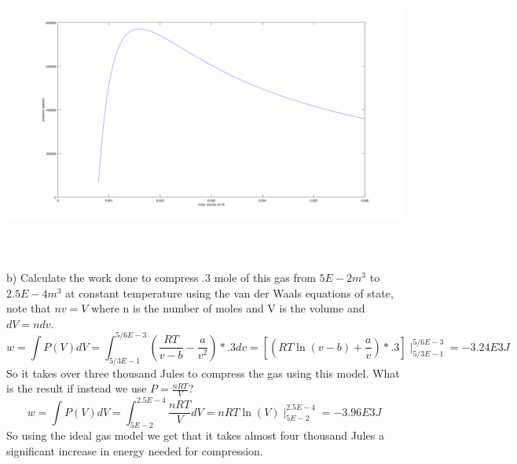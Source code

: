 \documentclass[10pt,a4paper]{article}
\begin{document}
\includegraphics[scale=.35]{two}\\\\\\\\

b)  Calculate the work done to compress .3 mole of this gas from $5E-2m^3$ to $2.5E-4m^3$ at constant temperature using the van der Waals equations of state, note that \(nv=V\) where n is the number of moles and V is the volume and \(dV=ndv\).\[w=\int P(V)dV=\int_{5/3E-1}^{5/6E-3}(\frac{RT}{v-b}-\frac{a}{v^2})*.3dv=[(RT\ln(v-b)+\frac{a}{v})*.3]\mid_{5/3E-1}^{5/6E-3}=-3.24E3J\]So it takes over three thousand Jules to compress the gas using this model.  What is the result if instead we use \(P=\frac{nRT}{V}\)?\[w=\int P(V)dV=\int_{5E-2}^{2.5E-4}\frac{nRT}{V}dV=nRT\ln(V)\mid_{5E-2}^{2.5E-4}=-3.96E3J\]So using the ideal gas model we get that it takes almost four thousand Jules a significant increase in energy needed for compression.
\end{document}
